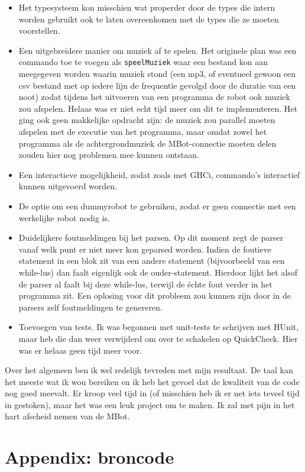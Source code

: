 \documentclass[11pt]{article}
\begin{document}
\begin{itemize}
    \item Het typesysteem kon misschien wat properder door de types die intern worden gebruikt ook te laten overeenkomen met de types die ze moeten voorstellen.
    \item Een uitgebreidere manier om muziek af te spelen. Het originele plan was een commando toe te voegen als \texttt{speelMuziek} waar een bestand kon aan meegegeven worden waarin muziek stond (een mp3, of eventueel gewoon een csv bestand met op iedere lijn de frequentie gevolgd door de duratie van een noot) zodat tijdens het uitvoeren van een programma de robot ook muziek zou afspelen. Helaas was er niet echt tijd meer om dit te implementeren. Het ging ook geen makkelijke opdracht zijn: de muziek zou parallel moeten afspelen met de executie van het programma, maar omdat zowel het programma als de achtergrondmuziek de MBot-connectie moeten delen zouden hier nog problemen mee kunnen ontstaan.
    \item Een interactieve mogelijkheid, zodat zoals met GHCi, commando's interactief kunnen uitgevoerd worden.
    \item De optie om een dummyrobot te gebruiken, zodat er geen connectie met een werkelijke robot nodig is.
    \item Duidelijkere foutmeldingen bij het parsen. Op dit moment zegt de parser vanaf welk punt er niet meer kon geparsed worden. Indien de foutieve statement in een blok zit van een andere statement (bijvoorbeeld van een while-lus) dan faalt eigenlijk ook de ouder-statement. Hierdoor lijkt het alsof de parser al faalt bij deze while-lus, terwijl de échte fout verder in het programma zit. Een oplosing voor dit probleem zou kunnen zijn door in de parsers zelf foutmeldingen te genereren.
    \item Toevoegen van tests. Ik was begonnen met unit-tests te schrijven met HUnit, maar heb die dan weer verwijderd om over te schakelen op QuickCheck. Hier was er helaas geen tijd meer voor.
\end{itemize}
Over het algemeen ben ik wel redelijk tevreden met mijn resultaat. De taal kan het meeste wat ik wou bereiken en ik heb het gevoel dat de kwaliteit van de code nog goed meevalt. Er kroop veel tijd in (of misschien heb ik er net iets teveel tijd in gestoken), maar het was een leuk project om te maken. Ik zal met pijn in het hart afscheid nemen van de MBot.


\newpage
{}
\section{Appendix: broncode}
\lstset{language=Haksell, numbers=left}

\lstset{firstnumber=last}








\end{document}
